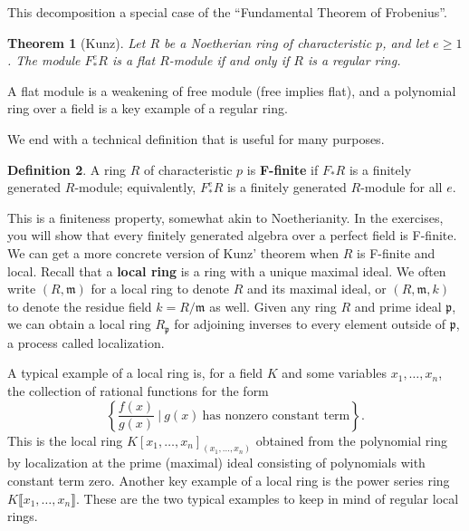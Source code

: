 \documentclass[12pt]{amsart}
\newtheorem{theorem}{Theorem}[section]
\theoremstyle{definition}
\newtheorem{definition}[theorem]{Definition}
\numberwithin{equation}{theorem}
\def\frakm{\mathfrak{m}}
\def\frakp{\mathfrak{p}}
\begin{document}
This decomposition a special case of the ``Fundamental Theorem of Frobenius''. 
\begin{theorem}[Kunz]
Let $R$ be a Noetherian ring of characteristic $p$, and let $e\geq 1$. The module $F^e_* R$ is a flat $R$-module if and only if $R$ is a regular ring.
\end{theorem}

A flat module is a weakening of free module (free implies flat), and a polynomial ring over a field is a key example of a regular ring.  


We end with a technical definition that is useful for many purposes.

\begin{definition} A ring $R$ of characteristic $p$ is \textbf{F-finite} if $F_*R$ is a finitely generated $R$-module; equivalently, $F^e_*R$ is a finitely generated $R$-module for all $e$.
\end{definition}

This is a finiteness property, somewhat akin to Noetherianity. In the exercises, you will show that every finitely generated algebra over a perfect field is F-finite. We can get a more concrete version of Kunz' theorem when $R$ is F-finite and local. Recall that a \textbf{local ring} is a ring with a unique maximal ideal. We often write $(R,\frakm)$ for a local ring to denote $R$ and its maximal ideal, or $(R,\frakm,k)$ to denote the residue field $k=R/\frakm$ as well. Given any ring $R$ and prime ideal $\frakp$, we can obtain a local ring $R_\frakp$ for adjoining inverses to every element outside of $\frakp$, a process called localization. 

A typical example of a local ring is, for a field $K$ and some variables $x_1,\dots,x_n$, the collection of rational functions for the form 
\[ \left\{ \frac{f(x)}{g(x)} \ \big| \ g(x) \ \text{has nonzero constant term}\right\}.\]
This is the local ring $K[x_1,\dots,x_n]_{(x_1,\dots,x_n)}$ obtained from the polynomial ring by localization at the prime (maximal) ideal consisting of polynomials with constant term zero. Another key example of a local ring  is the power series ring $K\llbracket x_1,\dots,x_n \rrbracket$. These are the two typical examples to keep in mind of regular local rings.
\end{document}
